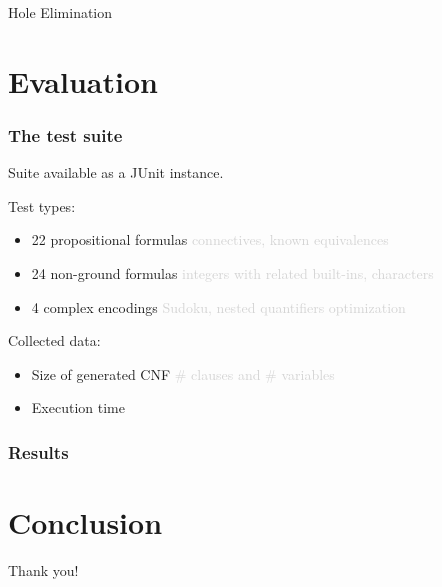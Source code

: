 \documentclass[smaller,dvipsnames,ratio=169]{beamer}
\begin{document}
  \begin{frame}{Hole Elimination}

  \end{frame}

  \section{Evaluation}

  \begin{frame}
    \frametitle{The test suite}
    Suite available as a \alert{JUnit} instance.

    Test types:
    \begin{itemize}
      \item 22 propositional formulas \textcolor{lightgray}{connectives, known equivalences}
      \item 24 non-ground formulas \textcolor{lightgray}{integers with related built-ins, characters}
      \item 4 complex encodings \textcolor{lightgray}{Sudoku, nested quantifiers optimization}
    \end{itemize}
    Collected data:
    \begin{itemize}
      \item \alert{Size} of generated CNF \textcolor{lightgray}{\# clauses and \# variables}
      \item Execution \alert{time}
    \end{itemize}
  \end{frame}

  \begin{frame}
    \frametitle{Results}
  \end{frame}

  \section{Conclusion}


  \begin{frame}[standout]
    Thank you!
  \end{frame}
\end{document}
